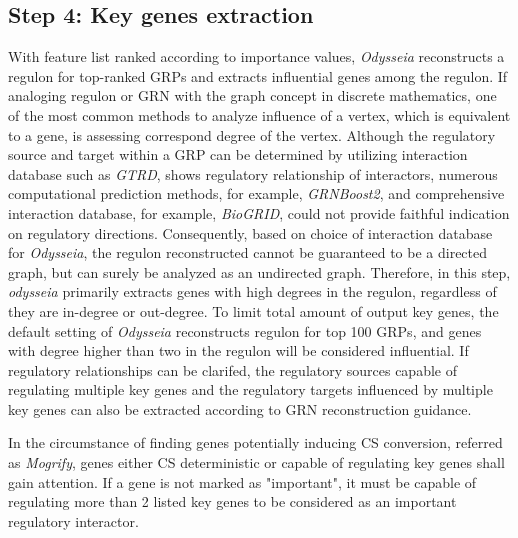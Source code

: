 \documentclass[fleqn,10pt]{wlscirep}
\begin{document}
\subsection*{Step 4: Key genes extraction}
\label{step4}
With feature list ranked according to importance values, \emph{Odysseia} reconstructs a regulon for top-ranked GRPs and extracts influential genes among the regulon.
If analoging regulon or GRN with the graph concept in discrete mathematics, one of the most common methods to analyze influence of a vertex, which is equivalent to a gene, is assessing correspond degree of the vertex.
Although the regulatory source and target within a GRP can be determined by utilizing interaction database such as \emph{GTRD}\cite{gkaa1057}, shows regulatory relationship of interactors, numerous computational prediction methods, for example,  \emph{GRNBoost2}\cite{grnboost2}, and comprehensive interaction database, for example, \emph{BioGRID}\cite{biogrid}, could not provide faithful indication on regulatory directions.
Consequently, based on choice of interaction database for \emph{Odysseia}, the regulon reconstructed cannot be guaranteed to be a directed graph, but can surely be analyzed as an undirected graph.
Therefore, in this step, \emph{odysseia} primarily extracts genes with high degrees in the regulon, regardless of they are in-degree or out-degree.
To limit total amount of output key genes, the default setting of \emph{Odysseia} reconstructs regulon for top 100 GRPs, and genes with degree higher than two in the regulon will be considered influential.
If regulatory relationships can be clarifed, the regulatory sources capable of regulating multiple key genes and the regulatory targets influenced by multiple key genes can also be extracted according to GRN reconstruction guidance.

In the circumstance of finding genes potentially inducing CS conversion, referred as \emph{Mogrify}\cite{mogrify_2016}, genes either CS deterministic or capable of regulating key genes shall gain attention.
If a gene is not marked as "important", it must be capable of regulating more than 2 listed key genes to be considered as an important regulatory interactor.
\end{document}
